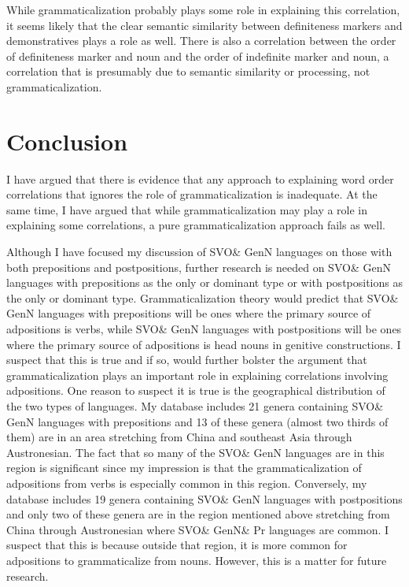 \documentclass[output=paper]{langsci/langscibook}
\begin{document}
While grammaticalization probably plays some role in explaining this correlation, it seems likely that the clear semantic similarity between definiteness markers and demonstratives plays a role as well. There is also a correlation between the order of definiteness marker and noun and the order of indefinite marker and noun, a correlation that is presumably due to semantic similarity or processing, not grammaticalization.

\section{Conclusion}\label{sec:dryer:5}

I have argued that there is evidence that any approach to explaining word order correlations that ignores the role of grammaticalization is inadequate. At the same time, I have argued that while grammaticalization may play a role in explaining some correlations, a pure grammaticalization approach fails as well.

Although I have focused my discussion of SVO\& GenN languages on those with both prepositions and postpositions, further research is needed on SVO\& GenN languages with prepositions as the only or dominant type or with postpositions as the only or dominant type. Grammaticalization theory would predict that SVO\& GenN languages with prepositions will be ones where the primary source of adpositions is verbs, while SVO\& GenN languages with postpositions will be ones where the primary source of adpositions is head nouns in genitive constructions. I suspect that this is true and if so, would further bolster the argument that grammaticalization plays an important role in explaining correlations involving adpositions. One reason to suspect it is true is the geographical distribution of the two types of languages. My database includes 21 genera containing SVO\& GenN languages with prepositions and 13 of these genera (almost two thirds of them) are in an area stretching from China and southeast Asia through Austronesian. The fact that so many of the SVO\& GenN languages are in this region is significant since my impression is that the grammaticalization of adpositions from verbs is especially common in this region. Conversely, my database includes 19 genera containing SVO\& GenN languages with postpositions and only two of these genera are in the region mentioned above stretching from China through Austronesian where SVO\& GenN\& Pr languages are common. I suspect that this is because outside that region, it is more common for adpositions to grammaticalize from nouns. However, this is a matter for future research.
\end{document}
